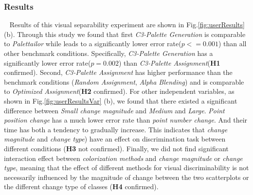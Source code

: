 \subsubsection{Results}
\
\newline
Results of this visual separability experiment are shown in Fig.\ref{fig:userResults} (b).
Through this study we found that first \emph{C3-Palette Generation} is comparable to \emph{Palettailor} while leads to a significantly lower error rate(\emph{$p<=0.001$}) than all other benchmark conditions. Specifically, \emph{C3-Palette Generation} has a significantly lower error rate(\emph{$p=0.002$}) than \emph{C3-Palette Assignment}(\textbf{H1} confirmed).
Second, \emph{C3-Palette Assignment} has higher performance than the benchmark conditions (\emph{Random Assignment}, \emph{Alpha Blending}) and is comparable to \emph{Optimized Assignment}(\textbf{H2} confirmed).
For other independent variables, as shown in Fig.\ref{fig:userResultsVar} (b), we found that there existed a significant difference between \emph{Small change magnitude} and \emph{Medium} and \emph{Large}. \emph{Point position change} has a much lower error rate than \emph{point number change}. And their time has both a tendency to gradually increase. This indicates that \emph{change magnitude} and \emph{change type}) have an effect on discrimination task between different conditions (\textbf{H3} not confirmed). 
Finally, we did not find significant interaction effect between \emph{colorization methods} and \emph{change magnitude} or \emph{change type}, meaning that the effect of different methods for visual discriminability is not 
necessarily influenced by the magnitude of change between the two scatterplots or the different change type of classes (\textbf{H4} confirmed).
\vspace{.3em}
